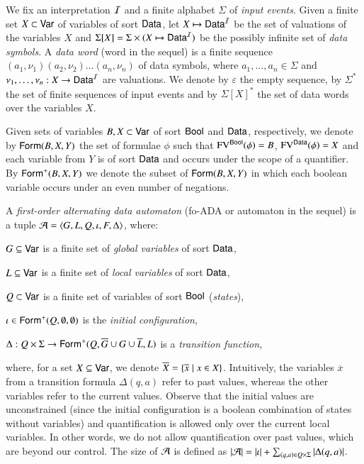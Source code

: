 \documentclass{llncs}
\begin{document}
We fix an interpretation $\mathcal{I}$ and a finite alphabet $\Sigma$ of
\emph{input events}. Given a finite set $X \subset \mathsf{Var}$ of
variables of sort $\mathsf{Data}$, let $X \mapsto \mathsf{Data}^{\mathcal{I}}$ be the set
of valuations of the variables $X$ and $\Sigma[X] = \Sigma
\times (X \mapsto \mathsf{Data}^{\mathcal{I}})$ be the possibly infinite set of
\emph{data symbols}. A \emph{data word} (word in the sequel) is a
finite sequence $(a_1,\nu_1)(a_2,\nu_2) \ldots (a_n,\nu_n)$ of data
symbols, where $a_1,\ldots,a_n \in \Sigma$ and $\nu_1,\ldots,\nu_n :
X \rightarrow \mathsf{Data}^{\mathcal{I}}$ are valuations. We denote by
$\varepsilon$ the empty sequence, by $\Sigma^*$ the set of finite
sequences of input events and by $\Sigma[X]^*$ the set of data
words over the variables $X$.

Given sets of variables $B,X \subset \mathsf{Var}$ of sort $\mathsf{Bool}$ and
$\mathsf{Data}$, respectively, we denote by $\mathsf{Form}(B,X,Y)$ the set of formulae
$\phi$ such that $\mathrm{FV}^{\mathsf{Bool}}(\phi) = B$, $\mathrm{FV}^{\mathsf{Data}}(\phi) = X$ and
each variable from $Y$ is of sort $\mathsf{Data}$ and occurs under the scope
of a quantifier. By $\mathsf{Form}^+(B,X,Y)$ we denote the subset of
$\mathsf{Form}(B,X,Y)$ in which each boolean variable occurs under an even
number of negations.

A \emph{first-order alternating data automaton} (fo-ADA or automaton
in the sequel) is a tuple $\mathcal{A} =
\left\langle G,L,Q,\iota,F,\Delta \right\rangle$, where: \begin{compactitem}
%
\item $G \subseteq \mathsf{Var}$ is a finite set of \emph{global
  variables} of sort $\mathsf{Data}$, 
%
\item $L \subseteq \mathsf{Var}$ is a finite set of \emph{local
  variables} of sort $\mathsf{Data}$,
%
\item $Q \subset \mathsf{Var}$ is a finite set of variables of sort $\mathsf{Bool}$
  (\emph{states}),
%
\item $\iota \in \mathsf{Form}^+(Q,\emptyset,\emptyset)$ is the \emph{initial
  configuration},
%
\item $\Delta : Q \times \Sigma \rightarrow
  \mathsf{Form}^+(Q,\overline{G}\cup G\cup\overline{L},L)$
  is a \emph{transition function},
\end{compactitem}
where, for a set $X \subseteq \mathsf{Var}$, we denote $\overline{X} =
\left\{ \overline{x} \mid x \in X \right\}$. Intuitively, the variables
$\overline{x}$ from a transition formula $\Delta(q,a)$ refer to past
values, whereas the other variables refer to the current
values. Observe that the initial values are unconstrained (since the
initial configuration is a boolean combination of states without
variables) and quantification is allowed only over the current local
variables. In other words, we do not allow quantification over past
values, which are beyond our control. The size of $\mathcal{A}$ is defined as
${|{\mathcal{A}}|} = {|{\iota}|} + \sum_{(q,a) \in
  Q\times\Sigma}{|{\Delta(q,a)}|}$.



\end{document}
